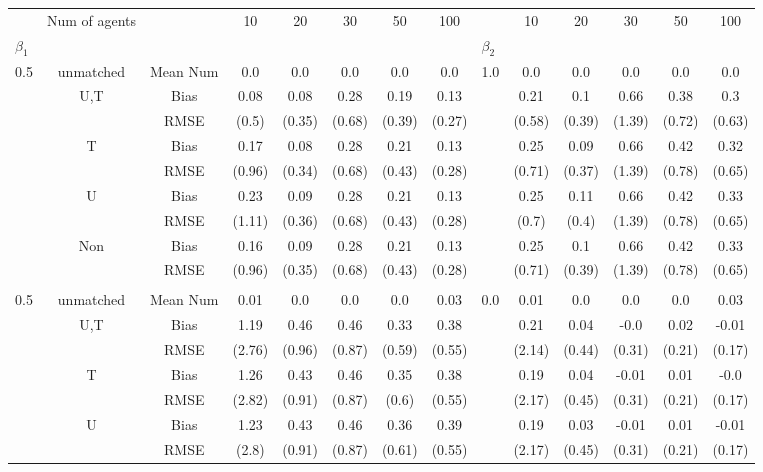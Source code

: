 \begin{tabular}{@{\extracolsep{5pt}}lc|cccccc|lccccc}
\toprule 
 & Num of agents &  & 10 & 20 & 30 & 50 & 100 &  & 10 & 20 & 30 & 50 & 100 \\
$\beta_1$ &  &  &  &  &  &  &  & $\beta_2$ &  &  &  &  &  \\
\midrule 
0.5 & unmatched & Mean Num & 0.0 & 0.0 & 0.0 & 0.0 & 0.0 & 1.0 & 0.0 & 0.0 & 0.0 & 0.0 & 0.0 \\
 & U,T & Bias & 0.08 & 0.08 & 0.28 & 0.19 & 0.13 &  & 0.21 & 0.1 & 0.66 & 0.38 & 0.3 \\
 &  & RMSE & (0.5) & (0.35) & (0.68) & (0.39) & (0.27) &  & (0.58) & (0.39) & (1.39) & (0.72) & (0.63) \\
 & T & Bias & 0.17 & 0.08 & 0.28 & 0.21 & 0.13 &  & 0.25 & 0.09 & 0.66 & 0.42 & 0.32 \\
 &  & RMSE & (0.96) & (0.34) & (0.68) & (0.43) & (0.28) &  & (0.71) & (0.37) & (1.39) & (0.78) & (0.65) \\
 & U & Bias & 0.23 & 0.09 & 0.28 & 0.21 & 0.13 &  & 0.25 & 0.11 & 0.66 & 0.42 & 0.33 \\
 &  & RMSE & (1.11) & (0.36) & (0.68) & (0.43) & (0.28) &  & (0.7) & (0.4) & (1.39) & (0.78) & (0.65) \\
 & Non & Bias & 0.16 & 0.09 & 0.28 & 0.21 & 0.13 &  & 0.25 & 0.1 & 0.66 & 0.42 & 0.33 \\
 &  & RMSE & (0.96) & (0.35) & (0.68) & (0.43) & (0.28) &  & (0.71) & (0.39) & (1.39) & (0.78) & (0.65) \\
 &  &  &  &  &  &  &  &  &  &  &  &  &  \\
0.5 & unmatched & Mean Num & 0.01 & 0.0 & 0.0 & 0.0 & 0.03 & 0.0 & 0.01 & 0.0 & 0.0 & 0.0 & 0.03 \\
 & U,T & Bias & 1.19 & 0.46 & 0.46 & 0.33 & 0.38 &  & 0.21 & 0.04 & -0.0 & 0.02 & -0.01 \\
 &  & RMSE & (2.76) & (0.96) & (0.87) & (0.59) & (0.55) &  & (2.14) & (0.44) & (0.31) & (0.21) & (0.17) \\
 & T & Bias & 1.26 & 0.43 & 0.46 & 0.35 & 0.38 &  & 0.19 & 0.04 & -0.01 & 0.01 & -0.0 \\
 &  & RMSE & (2.82) & (0.91) & (0.87) & (0.6) & (0.55) &  & (2.17) & (0.45) & (0.31) & (0.21) & (0.17) \\
 & U & Bias & 1.23 & 0.43 & 0.46 & 0.36 & 0.39 &  & 0.19 & 0.03 & -0.01 & 0.01 & -0.01 \\
 &  & RMSE & (2.8) & (0.91) & (0.87) & (0.61) & (0.55) &  & (2.17) & (0.45) & (0.31) & (0.21) & (0.17) \\

\end{tabular}
